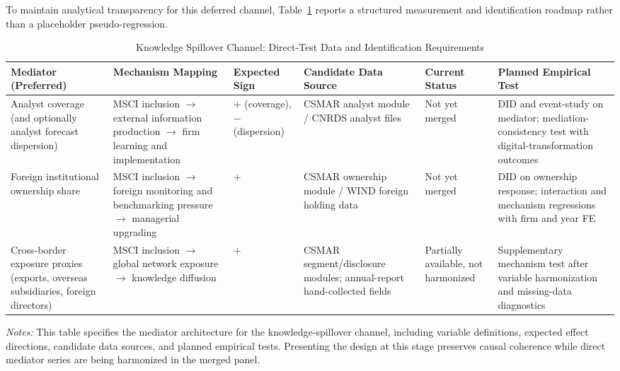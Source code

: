 To maintain analytical transparency for this deferred channel, Table~\ref{tab:knowledge_deferred} reports a structured measurement and identification roadmap rather than a placeholder pseudo-regression.

\begin{table}[!htbp]
\centering
\caption{Knowledge Spillover Channel: Direct-Test Data and Identification Requirements}
\label{tab:knowledge_deferred}
\small
\setlength{\tabcolsep}{4pt}
\begin{tabularx}{\textwidth}{>{\raggedright\arraybackslash}X>{\raggedright\arraybackslash}X>{\centering\arraybackslash}m{1.7cm}>{\raggedright\arraybackslash}X>{\centering\arraybackslash}m{2.0cm}>{\raggedright\arraybackslash}X}
\toprule
\textbf{Mediator (Preferred)} & \textbf{Mechanism Mapping} & \textbf{Expected Sign} & \textbf{Candidate Data Source} & \textbf{Current Status} & \textbf{Planned Empirical Test} \\
\midrule
Analyst coverage (and optionally analyst forecast dispersion) & MSCI inclusion $\to$ external information production $\to$ firm learning and implementation & $+$ (coverage), $-$ (dispersion) & CSMAR analyst module / CNRDS analyst files & Not yet merged & DID and event-study on mediator; mediation-consistency test with digital-transformation outcomes \\
Foreign institutional ownership share & MSCI inclusion $\to$ foreign monitoring and benchmarking pressure $\to$ managerial upgrading & $+$ & CSMAR ownership module / WIND foreign holding data & Not yet merged & DID on ownership response; interaction and mechanism regressions with firm and year FE \\
Cross-border exposure proxies (exports, overseas subsidiaries, foreign directors) & MSCI inclusion $\to$ global network exposure $\to$ knowledge diffusion & $+$ & CSMAR segment/disclosure modules; annual-report hand-collected fields & Partially available, not harmonized & Supplementary mechanism test after variable harmonization and missing-data diagnostics \\
\bottomrule
\end{tabularx}
\begin{tablenotes}
\small
\item \textit{Notes:} This table specifies the mediator architecture for the knowledge-spillover channel, including variable definitions, expected effect directions, candidate data sources, and planned empirical tests. Presenting the design at this stage preserves causal coherence while direct mediator series are being harmonized in the merged panel.
\end{tablenotes}
\end{table}

